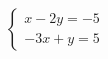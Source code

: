 $\displaystyle
\left\{
\begin{array}{l}
\displaystyle x - 2 y = -5 \\
\displaystyle -3x + y = 5
\end{array}
\right.
$ %
